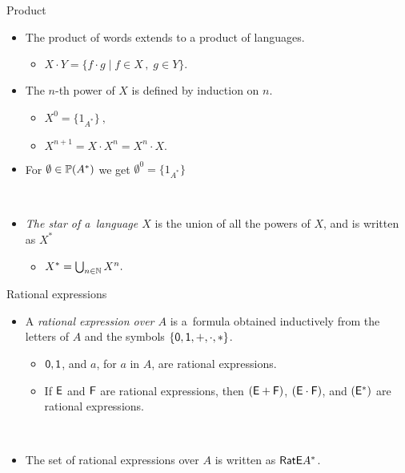 \documentclass{beamer}
\begin{document}
\begin{frame}{Product}
      \begin{itemize}
            \item The product of words extends to a product of languages.
            \begin{itemize}
                  \item $X \cdot Y = \{ f \cdot g \mid f \in X \, , \; g \in Y \}.$
            \end{itemize}
            \pause
            \item The $n$-th power of $X$ is defined by induction on $n$.
            \begin{itemize}
                  \item $X^0 = \{1_{A^*}\} \: ,$
                  \item $X^{n+1} = X \cdot X^n = X^n \cdot X.$
            \end{itemize}
            \item For $\emptyset \in \mathbb{P}(A^*)$ we get $\emptyset^0 = \{1_{A^*}\}$

            ~
            \pause

            \item \emph{The star of a~language $X$} is the union of all the powers of $X$, and is written as $X^*$
            \begin{itemize}
                  \item $X^* = \bigcup_{n \in \mathbb{N}} X^n.$
            \end{itemize}
      \end{itemize}
\end{frame}


\begin{frame}{Rational expressions}
      \begin{itemize}
            \item A \emph{rational expression over $A$} is a~formula obtained inductively from the letters of $A$ and the symbols $\{{\mathsf{0}}, {\mathsf{1}}, +, \cdot, *\}$.
            \begin{itemize}
                  \item ${\mathsf{0}}, {\mathsf{1}}$, and $a$, for $a$ in $A$, are rational expressions.
                  \item If ${\mathsf{E}}$ and ${\mathsf{F}}$ are rational expressions, then $({\mathsf{E}} + {\mathsf{F}})$, $({\mathsf{E}} \cdot {\mathsf{F}})$, and $({\mathsf{E}}^*)$ are rational expressions.
            \end{itemize}
            ~
            \item The set of rational expressions over $A$ is written as ${\mathsf{RatE}} A^*$.
      \end{itemize}
\end{frame}
\end{document}
